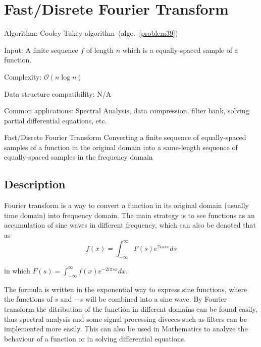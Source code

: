 \documentclass{article}
\begin{document}
\fi

%
%

\def\pbname{Fast/Disrete Fourier Transform} %

\section{\pbname} 

\begin{overview}
\item [Algorithm:]Cooley-Tukey algorithm~(algo.~\ref{problem39}) 
\item [Input:] A finite sequence $f$ of length $n$ which is a equally-spaced sample of a function.
\item [Complexity:]  $\mathcal{O}(n\log{n})$
\item [Data structure compatibility:] N/A
\item [Common applications:] Spectral Analysis, data compression, filter bank, solving partial differential equations, etc.
\end{overview}



\begin{problem}{\pbname}
	Converting a finite sequence of equally-spaced samples of a function in the original domain into a same-length sequence of equally-spaced samples in the frequency domain
\end{problem}

\subsection*{Description}
Fourier transform is a way to convert a function in its original domain (usually time domain) into frequency domain. The main strategy is to see functions as an accumulation of sine waves in different frequency, which can also be denoted that as $$f(x) = \int_{-\infty}^{\infty}F(s)e^{2i\pi sx} ds$$

in which $F(s) = \int_{-\infty}^{\infty}f(x)e^{-2i\pi sx} dx$. 

The formula is written in the exponential way to express sine functions, where the functions of $s$ and $-s$ will be combined into a sine wave. By Fourier transform the ditribution of the function in different domains can be found easily, thus spectral analysis and some signal processing diveces such as filters can be implemented more easily. This can also be used in Mathematics to analyze the behaviour of a function or in solving differential equations.
\end{document}

